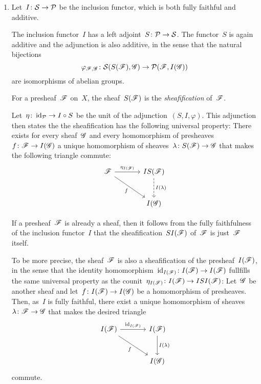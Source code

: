 \begin{example}
\begin{enumerate}
    \item
      Let~$I \colon \mathcal{S} \to \mathcal{P}$ be the inclusion functor, which is both fully faithful and additive.
      
      \begin{fact}
        The inclusion functor~$I$ has a left adjoint~$S \colon \mathcal{P} \to \mathcal{S}$.
        The functor~$S$ is again additive and the adjunction is also additive, in the sense that the natural bijections
        \[
                  \varphi_{\mathscr{F},\mathscr{G}}
          \colon  \mathcal{S}(S(\mathscr{F}), \mathscr{G})
          \to     \mathcal{P}(\mathscr{F}, I(\mathscr{G}))
        \]
        are isomorphisms of abelian groups.
      \end{fact}
      
      \begin{definitionnonum}
        For a presheaf~$\mathscr{F}$ on~$X$, the sheaf~$S(\mathscr{F})$ is the \emph{sheafification} of~$\mathscr{F}$.
      \end{definitionnonum}
      
      Let~$\eta \colon \operatorname{id}_{\mathcal{P}} \to I \circ S$ be the unit of the adjunction~$(S,I,\varphi)$.
      This adjunction then states the the sheafification has the following universal property:      
      There exists for every sheaf~$\mathscr{G}$ and every homomorphism of presheaves~$f \colon \mathscr{F} \to I(\mathscr{G})$ a unique homomorphism of sheaves~$\lambda \colon S(\mathscr{F}) \to \mathscr{G}$ that makes the following triangle commute:
      \[
        \begin{tikzcd}[sep = large]
            \Fs
            \arrow{r}[above]{\eta_{I(\Fs)}}
            \arrow{dr}[below left]{f}
          & IS(\Fs)
            \arrow[dashed]{d}[right]{I(\lambda)}
          \\
            {}
          & I(\Gs)
        \end{tikzcd}
      \]
      
      If a presheaf~$\mathscr{F}$ is already a sheaf, then it follows from the fully faithfulness of the inclusion functor~$I$ that the sheafification~$SI(\mathscr{F})$ of~$\mathscr{F}$ is just~$\mathscr{F}$ itself.
      
      To be more precise, the sheaf~$\mathscr{F}$ is also a sheafification of the presheaf~$I(\mathscr{F})$, in the sense that the identity homomorphism~$\operatorname{id}_{I(\mathscr{F})} \colon I(\mathscr{F}) \to I(\mathscr{F})$ fullfills the same universal property as the counit~$\eta_{I(\mathscr{F})} \colon I(\mathscr{F}) \to ISI(\mathscr{F})$:
      Let~$\mathscr{G}$ be another sheaf and let~$f \colon I(\mathscr{F}) \to I(\mathscr{G})$ be a homomorphism of presheaves.
      Then, as~$I$ is fully faithful, there exist a unique homomorphism of sheaves~$\lambda \colon \mathscr{F} \to \mathscr{G}$ that makes the desired triangle
      \[
        \begin{tikzcd}[sep = large]
            I(\Fs)
            \arrow{r}[above]{\id_{I(\Fs)}}
            \arrow{dr}[below left]{f}
          & I(\Fs)
            \arrow{d}[right]{I(\lambda)}
          \\
            {}
          & I(\Gs)
        \end{tikzcd}
      \]
      commute.
      

\end{enumerate}
\end{example}

